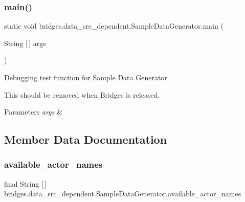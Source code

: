 \subsubsection{\texorpdfstring{main()}{main()}}
{\footnotesize\ttfamily static void bridges.\+data\+\_\+src\+\_\+dependent.\+Sample\+Data\+Generator.\+main (\begin{DoxyParamCaption}\item[{String \mbox{[}$\,$\mbox{]}}]{args }\end{DoxyParamCaption})\hspace{0.3cm}{\ttfamily [static]}}

Debugging test function for Sample Data Generator

This should be removed when Bridges is released. 
\begin{DoxyParams}{Parameters}
{\em args} & \\
\hline
\end{DoxyParams}


\subsection{Member Data Documentation}
\hypertarget{classbridges_1_1data__src__dependent_1_1_sample_data_generator_aac86cadaeb8859e94b6ed47a066cbbfc}{}\label{classbridges_1_1data__src__dependent_1_1_sample_data_generator_aac86cadaeb8859e94b6ed47a066cbbfc} 
\subsubsection{\texorpdfstring{available\+\_\+actor\+\_\+names}{available\_actor\_names}}
{\footnotesize\ttfamily final String \mbox{[}$\,$\mbox{]} bridges.\+data\+\_\+src\+\_\+dependent.\+Sample\+Data\+Generator.\+available\+\_\+actor\+\_\+names\hspace{0.3cm}{\ttfamily [static]}}

\hypertarget{classbridges_1_1data__src__dependent_1_1_sample_data_generator_a304c946018534a5a2b0049aace9d4472}{}\label{classbridges_1_1data__src__dependent_1_1_sample_data_generator_a304c946018534a5a2b0049aace9d4472} 
